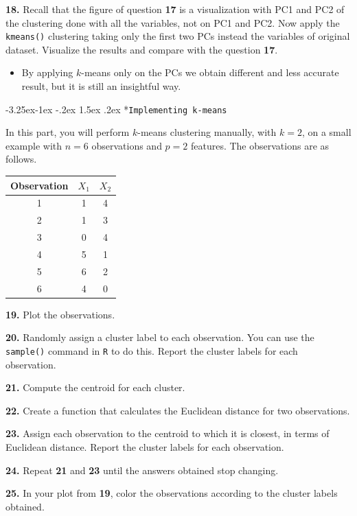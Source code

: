\documentclass[]{book}
\makeatletter
\newenvironment{rmdblock}[1]
  {\begin{shaded*}
  \begin{itemize}
  \renewcommand{\labelitemi}{
    \raisebox{-.7\height}[0pt][0pt]{
      {\setkeys{Gin}{width=2em,keepaspectratio}\texttt{[image: img/icons/\#1]}}
    }
  }
  \item
  }
  {
  \end{itemize}
  \end{shaded*}
  }
\newenvironment{rmdinsight}
  {\begin{rmdblock}{insight}}
  {\end{rmdblock}}
\renewcommand\subsection{\@startsection{subsection}{2}{\z@}%
                                     {-3.25ex\@plus -1ex \@minus -.2ex}%
                                     {1.5ex \@plus .2ex}%
                                     {\normalfont\large\bfseries\color{Violet}}}
\theoremstyle{definition}
\theoremstyle{definition}
\theoremstyle{definition}
\theoremstyle{remark}
\makeatother
\begin{document}
\textbf{18.} Recall that the figure of question \textbf{17} is a
visualization with PC1 and PC2 of the clustering done with all the
variables, not on PC1 and PC2. Now apply the \texttt{kmeans()}
clustering taking only the first two PCs instead the variables of
original dataset. Visualize the results and compare with the question
\textbf{17}.

\begin{rmdinsight}
By applying \(k\)-means only on the PCs we obtain different and less
accurate result, but it is still an insightful way.
\end{rmdinsight}

\subsection*{\texorpdfstring{\texttt{Implementing\ k-means}}{Implementing k-means}}\label{implementing-k-means}

In this part, you will perform \(k\)-means clustering manually, with
\(k=2\), on a small example with \(n=6\) observations and \(p=2\)
features. The observations are as follows.

\begin{longtable}[]{@{}ccc@{}}
\toprule
\textbf{Observation} & \textbf{\(X_1\)} &
\textbf{\(X_2\)}\tabularnewline
\midrule
\endhead
1 & 1 & 4\tabularnewline
2 & 1 & 3\tabularnewline
3 & 0 & 4\tabularnewline
4 & 5 & 1\tabularnewline
5 & 6 & 2\tabularnewline
6 & 4 & 0\tabularnewline
\bottomrule
\end{longtable}

\textbf{19.} Plot the observations.

\textbf{20.} Randomly assign a cluster label to each observation. You
can use the \texttt{sample()} command in \texttt{R} to do this. Report
the cluster labels for each observation.

\textbf{21.} Compute the centroid for each cluster.

\textbf{22.} Create a function that calculates the Euclidean distance
for two observations.

\textbf{23.} Assign each observation to the centroid to which it is
closest, in terms of Euclidean distance. Report the cluster labels for
each observation.

\textbf{24.} Repeat \textbf{21} and \textbf{23} until the answers
obtained stop changing.

\textbf{25.} In your plot from \textbf{19}, color the observations
according to the cluster labels obtained.
\end{document}
